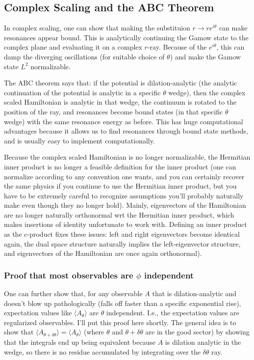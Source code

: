 \subsection{Complex Scaling and the ABC Theorem}
In complex scaling, one can show that making the substituion $r\rightarrow re^{i\theta}$ can make resonances appear bound. This is analytically continuing the Gamow state to the complex plane and evaluating it on a complex $r$-ray. Because of the $e^{i\theta}$, this can damp the diverging oscillations (for suitable choice of $\theta$) and make the Gamow state $L^2$ normalizable.

The ABC theorem says that: if the potential is dilation-analytic (the analytic continuation of the potential is analytic in a specific $\theta$ wedge), then the complex scaled Hamiltonian is analytic in that wedge, the continuum is rotated to the position of the ray, and resonances become bound states (in that specific $\theta$ wedge) with the same resonance energy as before. This has huge computational advantages because it allows us to find resonances through bound state methods, and is usually easy to implement computationally.

Because the complex scaled Hamiltonian is no longer normalizable, the Hermitian inner product is no longer a feasible definition for the inner product (one can normalize according to any convention one wants, and you can certainly recover the same physics if you continue to use the Hermitian inner product, but you have to be extremely careful to recognize assumptions you'll probably naturally make even though they no longer hold). Mainly, eigenvectors of the Hamiltonian are no longer naturally orthonormal wrt the Hermitian inner product, which makes insertions of identity unfortunate to work with. Defining an inner product as the c-product fixes these issues: left and right eigenvectors become identical again, the dual space structure naturally implies the left-eigenvector structure, and eigenvectors of the Hamiltonian are once again orthonormal).

\subsubsection{Proof that most observables are $\phi$ independent}\label{sssection:obs_phi_indep}
One can further show that, for any observable $A$ that is dilation-analytic and doesn't blow up pathologically (falls off faster than a specific exponential rise), expectation values like $\langle A_\theta \rangle$ are $\theta$ independent. I.e., the expectation values are regularized observables. I'll put this proof here shortly. The general idea is to show that $\langle A_{\theta+\delta\theta}\rangle = \langle A_{\theta}\rangle$ (where $\theta$ and $\theta+\delta\theta$ are in the good sector) by showing that the integrals end up being equivalent because $A$ is dilation analytic in the wedge, so there is no residue accumulated by integrating over the $\delta \theta$ ray.
